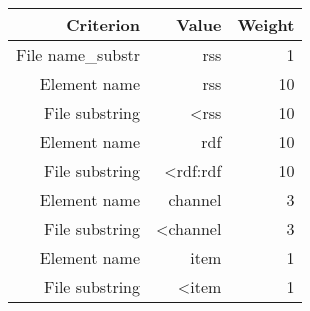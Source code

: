 \begin{tabular}{|r|r|r|}
\hline
\bf Criterion&\bf Value&\bf Weight\\
\hline
File name_substr&rss&1\\
\hline
Element name&rss&10\\
\hline
File substring&<rss&10\\
\hline
Element name&rdf&10\\
\hline
File substring&<rdf:rdf&10\\
\hline
Element name&channel&3\\
\hline
File substring&<channel&3\\
\hline
Element name&item&1\\
\hline
File substring&<item&1\\
\hline
\end{tabular}
